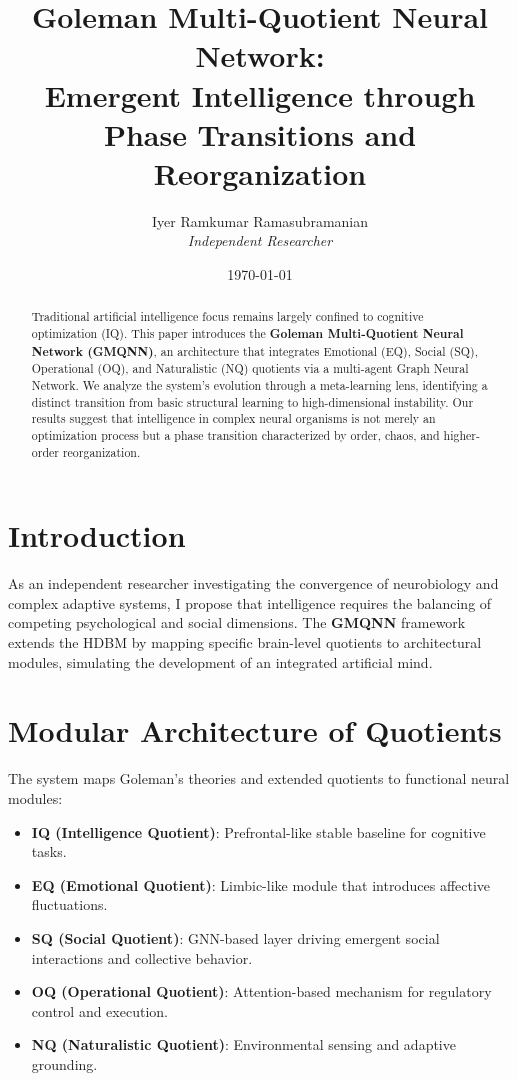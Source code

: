 \documentclass[12pt]{article}
\title{\textbf{Goleman Multi-Quotient Neural Network: \\ Emergent Intelligence through Phase Transitions and Reorganization}}
\author{Iyer Ramkumar Ramasubramanian \\ \textit{Independent Researcher}}
\date{\today}
\begin{document}
\maketitle

\begin{abstract}
Traditional artificial intelligence focus remains largely confined to cognitive optimization (IQ). This paper introduces the \textbf{Goleman Multi-Quotient Neural Network (GMQNN)}, an architecture that integrates Emotional (EQ), Social (SQ), Operational (OQ), and Naturalistic (NQ) quotients via a multi-agent Graph Neural Network. We analyze the system's evolution through a meta-learning lens, identifying a distinct transition from basic structural learning to high-dimensional instability. Our results suggest that intelligence in complex neural organisms is not merely an optimization process but a phase transition characterized by order, chaos, and higher-order reorganization.
\end{abstract}

\section{Introduction}
As an independent researcher investigating the convergence of neurobiology and complex adaptive systems, I propose that intelligence requires the balancing of competing psychological and social dimensions. The \textbf{GMQNN} framework extends the HDBM by mapping specific brain-level quotients to architectural modules, simulating the development of an integrated artificial mind.

\section{Modular Architecture of Quotients}

The system maps Goleman’s theories and extended quotients to functional neural modules:

\begin{itemize}
\item \textbf{IQ (Intelligence Quotient)}: Prefrontal-like stable baseline for cognitive tasks.
\item \textbf{EQ (Emotional Quotient)}: Limbic-like module that introduces affective fluctuations.
\item \textbf{SQ (Social Quotient)}: GNN-based layer driving emergent social interactions and collective behavior.
\item \textbf{OQ (Operational Quotient)}: Attention-based mechanism for regulatory control and execution.
\item \textbf{NQ (Naturalistic Quotient)}: Environmental sensing and adaptive grounding.
\end{itemize}
\end{document}
